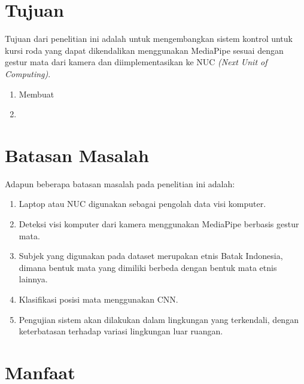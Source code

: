 \section{Tujuan}
\label{sec:Tujuan}

Tujuan dari penelitian ini adalah untuk mengembangkan sistem kontrol untuk kursi roda yang dapat dikendalikan menggunakan MediaPipe sesuai dengan gestur mata dari kamera dan diimplementasikan ke NUC \textit{(Next Unit of Computing)}.

\begin{enumerate}[nolistsep]

  \item Membuat \lipsum[2][1-3]

  \item \lipsum[3][1-3]

\end{enumerate}

\section{Batasan Masalah}
\label{sec:batasanmasalah}

Adapun beberapa batasan masalah pada penelitian ini adalah:

\begin{enumerate}[nolistsep]

  \item Laptop atau NUC digunakan sebagai pengolah data visi komputer.
  
  \item Deteksi visi komputer dari kamera menggunakan MediaPipe berbasis gestur mata.

  \item Subjek yang digunakan pada dataset merupakan etnis Batak Indonesia, dimana bentuk mata yang dimiliki berbeda dengan bentuk mata etnis lainnya.

  \item Klasifikasi posisi mata menggunakan CNN.

  \item Pengujian sistem akan dilakukan dalam lingkungan yang terkendali, dengan keterbatasan terhadap variasi lingkungan luar ruangan.

\end{enumerate}

\section{Manfaat}

